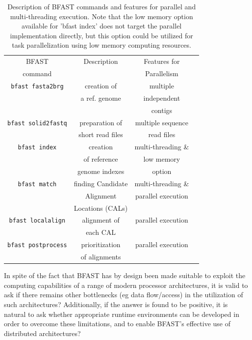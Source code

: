 \documentclass{acm_proc_article-sp}
\begin{document}
\begin{table}
\small
\begin{tabular}{|c|c|c|c|} 
  \hline BFAST & Description & Features for \\ command & & Parallelism
  \\ \hline \hline \texttt{bfast fasta2brg} & creation of & multiple \\ &a ref. genome &
  independent \\ & & contigs \\ \hline
  \texttt{bfast solid2fastq} & preparation of & multiple sequence \\ & short
  read files & read files\\ \hline

\texttt{bfast index} & creation  & multi-threading \& \\
& of reference  & low memory  \\ 
&genome indexes&option \\
 
  \hline
\texttt{bfast match} & finding Candidate   &  multi-threading \& \\

& Alignment &  parallel execution \\
& Locations (CALs) & \\\hline
\texttt{bfast localalign} & alignment of&   parallel execution \\
&  each CAL   & \\

  \hline
\texttt{bfast postprocess} & prioritization   &  parallel execution \\ 
& of alignments & \\
\hline


\hline
\end{tabular} \caption{Description of BFAST commands and features for parallel and multi-threading execution. 
Note that the low memory option available for 'bfast index' does not target the parallel implementation directly, 
but this option could be utilized for task parallelization using low memory computing resources.}
 \label{table:bfast-summary} 
\end{table}

In spite of the fact that BFAST has by design been made suitable to
exploit the computing capabilities of a range of modern processor
architectures, it is valid to ask if there remains other bottlenecks
(eg data flow/access) in the utilization of such architectures?
Additionally, if the answer is found to be positive, it is natural to
ask whether appropriate runtime environments can be developed in order
to overcome these limitations, and to enable BFAST's effective use of
distributed architectures?
\end{document}
